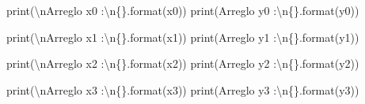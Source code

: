 \documentclass[
  letterpaper,
  DIV=11,
  numbers=noendperiod]{scrreprt}
\newenvironment{Shaded}{\begin{snugshade}}{\end{snugshade}}
\newcommand{\BuiltInTok}[1]{\textcolor[rgb]{0.00,0.23,0.31}{#1}}
\newcommand{\CharTok}[1]{\textcolor[rgb]{0.13,0.47,0.30}{#1}}
\newcommand{\NormalTok}[1]{\textcolor[rgb]{0.00,0.23,0.31}{#1}}
\newcommand{\SpecialCharTok}[1]{\textcolor[rgb]{0.37,0.37,0.37}{#1}}
\newcommand{\StringTok}[1]{\textcolor[rgb]{0.13,0.47,0.30}{#1}}
\begin{document}
\begin{Shaded}
\begin{Highlighting}[]
\BuiltInTok{print}\NormalTok{(}\StringTok{\textquotesingle{}}\CharTok{\textbackslash{}n}\StringTok{Arreglo x0 :}\CharTok{\textbackslash{}n}\SpecialCharTok{\{\}}\StringTok{\textquotesingle{}}\NormalTok{.}\BuiltInTok{format}\NormalTok{(x0))}
\BuiltInTok{print}\NormalTok{(}\StringTok{\textquotesingle{}Arreglo y0 :}\CharTok{\textbackslash{}n}\SpecialCharTok{\{\}}\StringTok{\textquotesingle{}}\NormalTok{.}\BuiltInTok{format}\NormalTok{(y0))}

\BuiltInTok{print}\NormalTok{(}\StringTok{\textquotesingle{}}\CharTok{\textbackslash{}n}\StringTok{Arreglo x1 :}\CharTok{\textbackslash{}n}\SpecialCharTok{\{\}}\StringTok{\textquotesingle{}}\NormalTok{.}\BuiltInTok{format}\NormalTok{(x1))}
\BuiltInTok{print}\NormalTok{(}\StringTok{\textquotesingle{}Arreglo y1 :}\CharTok{\textbackslash{}n}\SpecialCharTok{\{\}}\StringTok{\textquotesingle{}}\NormalTok{.}\BuiltInTok{format}\NormalTok{(y1))}

\BuiltInTok{print}\NormalTok{(}\StringTok{\textquotesingle{}}\CharTok{\textbackslash{}n}\StringTok{Arreglo x2 :}\CharTok{\textbackslash{}n}\SpecialCharTok{\{\}}\StringTok{\textquotesingle{}}\NormalTok{.}\BuiltInTok{format}\NormalTok{(x2))}
\BuiltInTok{print}\NormalTok{(}\StringTok{\textquotesingle{}Arreglo y2 :}\CharTok{\textbackslash{}n}\SpecialCharTok{\{\}}\StringTok{\textquotesingle{}}\NormalTok{.}\BuiltInTok{format}\NormalTok{(y2))}

\BuiltInTok{print}\NormalTok{(}\StringTok{\textquotesingle{}}\CharTok{\textbackslash{}n}\StringTok{Arreglo x3 :}\CharTok{\textbackslash{}n}\SpecialCharTok{\{\}}\StringTok{\textquotesingle{}}\NormalTok{.}\BuiltInTok{format}\NormalTok{(x3))}
\BuiltInTok{print}\NormalTok{(}\StringTok{\textquotesingle{}Arreglo y3 :}\CharTok{\textbackslash{}n}\SpecialCharTok{\{\}}\StringTok{\textquotesingle{}}\NormalTok{.}\BuiltInTok{format}\NormalTok{(y3))}
\end{Highlighting}
\end{Shaded}
\end{document}
